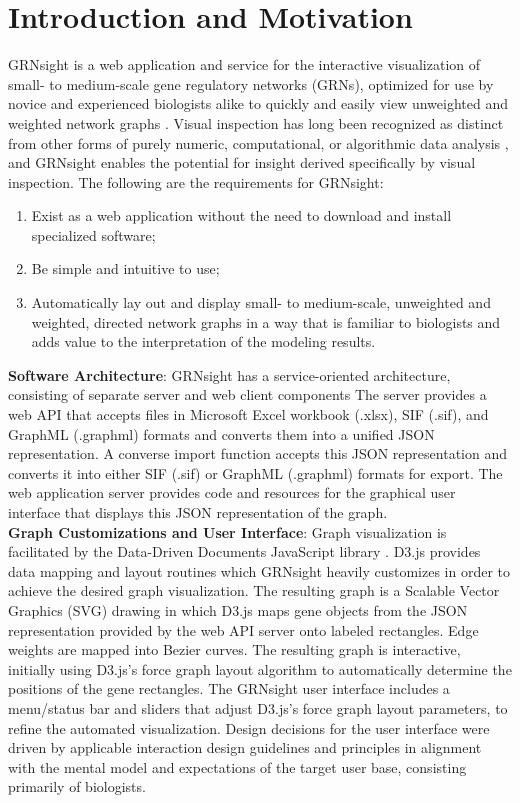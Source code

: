\documentclass[sigconf,review]{acmart}
\begin{document}
\section{Introduction and Motivation}

GRNsight is a web application and service for the interactive visualization of small- to medium-scale gene regulatory networks (GRNs), optimized for use by novice and experienced biologists alike to quickly and easily view unweighted and weighted network graphs \cite{peerj}. Visual inspection has long been recognized as distinct from other forms of purely numeric, computational, or algorithmic data analysis \cite{Tufte:1986:VDQ:33404, card1999readings}, and GRNsight enables the potential for insight derived specifically by visual inspection. The following are the requirements for GRNsight:

\begin{enumerate}
\item Exist as a web application without the need to download and install specialized software;
\item Be simple and intuitive to use;
\item Automatically lay out and display small- to medium-scale, unweighted and weighted, directed network graphs in a way that is familiar to biologists and adds value to the interpretation of the modeling results.
\end{enumerate} 

\textbf{Software Architecture}: GRNsight has a service-oriented architecture, consisting of separate server and web client components The server provides a web API that accepts files in Microsoft Excel workbook (.xlsx), SIF (.sif), and GraphML (.graphml) formats and converts them into a unified JSON representation. A converse import function accepts this JSON representation and converts it into either SIF (.sif) or GraphML (.graphml) formats for export. The web application server provides code and resources for the graphical user interface that displays this JSON representation of the graph.\\

\textbf{Graph Customizations and User Interface}: Graph visualization is facilitated by the Data-Driven Documents JavaScript library \cite{d3}. D3.js provides data mapping and layout routines which GRNsight heavily customizes in order to achieve the desired graph visualization. The resulting graph is a Scalable Vector Graphics (SVG) drawing in which D3.js maps gene objects from the JSON representation provided by the web API server onto labeled rectangles. Edge weights are mapped into Bezier curves. The resulting graph is interactive, initially using D3.js's force graph layout algorithm to automatically determine the positions of the gene rectangles. The GRNsight user interface includes a menu/status bar and sliders that adjust D3.js's force graph layout parameters, to refine the automated visualization. Design decisions for the user interface were driven by applicable interaction design guidelines and principles \cite{norman2013design,shneiderman2010designing,nielsen1994usability} in alignment with the mental model and expectations of the target user base, consisting primarily of biologists.
\end{document}
